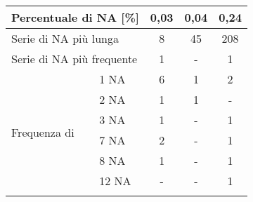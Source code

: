 \begin{table}
\begin{center}
\begin{tabular}{|ll|c|c|c|}
		\multicolumn{2}{|l|}{Percentuale di NA {[}\%{]}}                                                              & 0,03                                                                     & 0,04                                                                  & 0,24                \\ \hline
		\multicolumn{2}{|l|}{Serie di NA più lunga}                                                                   & 8                                                                        & 45                                                                    & 208                 \\ \hline
		\multicolumn{2}{|l|}{Serie di NA più frequente}                                                               & 1                                                                        & -                                                                     & 1                   \\ \hline
		\multirow{10}{*}{Frequenza di}                                     & 1 NA                                     & 6                                                                        & 1                                                                     & 2                   \\ \cline{3-5} 
		& 2 NA                                     & 1                                                                        & 1                                                                     & -                   \\ \cline{3-5} 
		& 3 NA                                     & 1                                                                        & -                                                                     & 1                   \\ \cline{3-5} 
		& 7 NA                                     & 2                                                                        & -                                                                     & 1                   \\ \cline{3-5} 
		& 8 NA                                     & 1                                                                        & -                                                                     & 1                   \\ \cline{3-5} 
		& 12 NA                                    & -                                                                        & -                                                                     & 1                   \\ \cline{3-5} 

\end{tabular}
\end{center}
\end{table}
